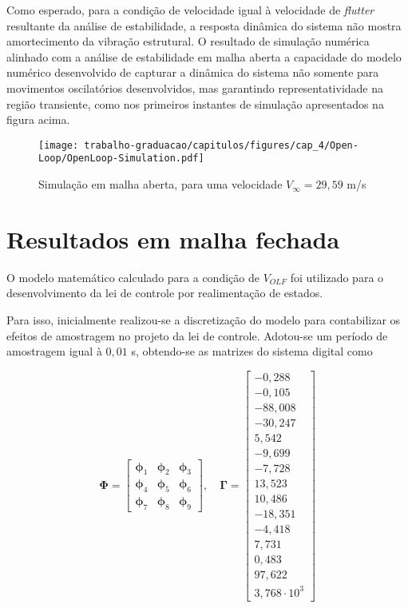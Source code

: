 Como esperado, para a condição de velocidade igual à velocidade de \textit{flutter} resultante da análise de estabilidade, a resposta dinâmica do sistema não mostra amortecimento da vibração estrutural. O resultado de simulação numérica alinhado com a análise de estabilidade em malha aberta a capacidade do modelo numérico desenvolvido de capturar a dinâmica do sistema não somente para movimentos oscilatórios desenvolvidos, mas garantindo representatividade na região transiente, como nos primeiros instantes de simulação apresentados na figura acima.

\begin{figure}[ht]
    \centering
    \caption{Simulação em malha aberta, para uma velocidade $V_{\infty} = 29,59$ m/s}
    \noindent\texttt{[image: trabalho-graduacao/capitulos/figures/cap\_4/Open-Loop/OpenLoop-Simulation.pdf]}
    \label{fig:OpenLoopSimulation}
\end{figure}



\section{Resultados em malha fechada}\label{sec:malha-fechada}

O modelo matemático calculado para a condição de $V_{OLF}$ foi utilizado para o desenvolvimento da lei de controle por realimentação de estados.

Para isso, inicialmente realizou-se a discretização do modelo para contabilizar os efeitos de amostragem no projeto da lei de controle. Adotou-se um período de amostragem igual à $0,01$ s, obtendo-se as matrizes do sistema digital como

\[
    \boldsymbol{\Phi} = \begin{bmatrix}
        \boldsymbol{\phi}_{1} & \boldsymbol{\phi}_{2} & \boldsymbol{\phi}_{3} \\
        \boldsymbol{\phi}_{4} & \boldsymbol{\phi}_{5} & \boldsymbol{\phi}_{6} \\
        \boldsymbol{\phi}_{7} & \boldsymbol{\phi}_{8} & \boldsymbol{\phi}_{9}
    \end{bmatrix}, \quad
    \boldsymbol{\Gamma} = \begin{bmatrix}  
    -0,288 \\ -0,105 \\ -88,008 \\ -30,247 \\ 5,542 \\ -9,699 \\ 
    -7,728 \\ 13,523 \\ 10,486 \\ -18,351 \\ -4,418 \\ 7,731  \\ 
    0,483 \\ 97,622 \\ 3,768\cdot10^{3}  
    \end{bmatrix}
\]

